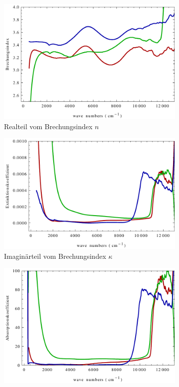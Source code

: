 \documentclass[paper=a4,fontsize=10pt,DIV=18,twocolumn,parskip=half]{scrartcl}
\numberwithin{equation}{section}    %
\begin{document}
\begin{figure}
    \centering
    \begin{subfigure}{\columnwidth}
        \includegraphics[width=\textwidth]{Bilder/brechzahl.pdf}
        \caption{Realteil vom Brechungsindex $n$}
        \label{bz}
    \end{subfigure}
    \begin{subfigure}{\columnwidth}
        \includegraphics[width=\textwidth]{Bilder/extinktion_avg.pdf}
        \caption{Imaginärteil vom Brechungsindex $\kappa$}
        \label{ex}
    \end{subfigure}
    \begin{subfigure}{\columnwidth}
        \includegraphics[width=\textwidth]{Bilder/absorption_avg.pdf}

\end{subfigure}
\end{figure}
\end{document}
